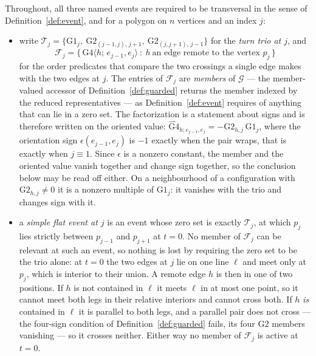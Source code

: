 \begin{convention}\label{conv:events}
Throughout, all three named events are required to be transversal in the
sense of Definition~\ref{def:event}, and for a polygon on $n$ vertices and an
index $j$:
\begin{itemize}
\item write $\mathcal T_j=\{\mathrm{G1}_j,\ \mathrm{G2}_{(j-1,j),\,j+1},\
\mathrm{G2}_{(j,j+1),\,j-1}\}$ for the \emph{turn trio at $j$}, and
\[
   \mathcal F_j=\bigl\{\,\mathrm{G4}\langle h;\,e_{j-1},e_j\rangle\ :\ h\
   \text{an edge remote to the vertex } p_j\,\bigr\}
\]
for the order predicates that compare the two crossings a single edge makes with
the two edges at $j$. The entries of $\mathcal F_j$ are \emph{members} of
$\mathcal G$ --- the member-valued accessor of Definition~\ref{def:guarded}
returns the member indexed by the reduced representatives --- as
Definition~\ref{def:event} requires of anything that can lie in a zero set. The
factorization is a statement about signs and is therefore written on the
oriented value:
$\widehat{\mathrm{G4}}_{h;e_{j-1},e_j}=-\mathrm{G2}_{h,j}\,\mathrm{G1}_j$,
where the orientation sign $\epsilon(e_{j-1},e_j)$ is $-1$ exactly when the
pair wraps, that is exactly when $j\equiv1$. Since $\epsilon$ is a nonzero
constant, the member and the oriented value vanish together and change sign
together, so the conclusion below may be read off either. On a
neighbourhood of a configuration with $\mathrm{G2}_{h,j}\neq0$ it is a nonzero
multiple of $\mathrm{G1}_j$: it vanishes with the trio and changes sign with it.
\item a \emph{simple flat event at $j$} is an event whose zero set is exactly
$\mathcal T_j$, at which $p_j$ lies strictly between $p_{j-1}$ and $p_{j+1}$ at
$t=0$. No member of $\mathcal F_j$ can be relevant at such an event, so nothing
is lost by requiring the zero set to be the trio alone: at $t=0$ the two edges
at $j$ lie on one line $\ell$ and meet only at $p_j$, which is interior to their
union. A remote edge $h$ is then in one of two positions. If $h$ is not
contained in $\ell$ it meets $\ell$ in at most one point, so it cannot meet both
legs in their relative interiors and cannot cross both. If $h$ \emph{is}
contained in $\ell$ it is parallel to both legs, and a parallel pair does not
cross --- the four-sign condition of Definition~\ref{def:guarded} fails, its
four $\mathrm{G2}$ members vanishing --- so it crosses neither. Either way no
member of $\mathcal F_j$ is active at $t=0$.


\end{itemize}
\end{convention}

